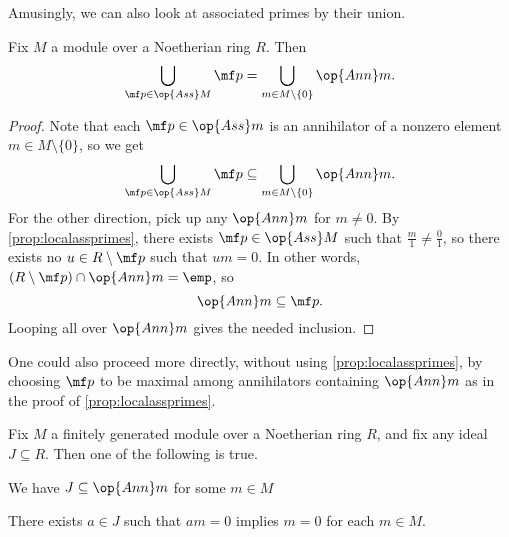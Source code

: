 Amusingly, we can also look at associated primes by their union.
\begin{proposition} \label{prop:unionass}
	Fix $M$ a module over a Noetherian ring $R$. Then
	\[\bigcup_{\mf p\in\op{Ass}M}\mf p=\bigcup_{m\in M\setminus\{0\}}\op{Ann}m.\]
\end{proposition}
\begin{proof}
	Note that each $\mf p\in\op{Ass}m$ is an annihilator of a nonzero element $m\in M\setminus\{0\}$, so we get
	\[\bigcup_{\mf p\in\op{Ass}M}\mf p\subseteq\bigcup_{m\in M\setminus\{0\}}\op{Ann}m.\]
	For the other direction, pick up any $\op{Ann}m$ for $m\ne0$. By \autoref{prop:localassprimes}, there exists $\mf p\in\op{Ass}M$ such that $\frac m1\ne\frac01$, so there exists no $u\in R\setminus\mf p$ such that $um=0$. In other words, $(R\setminus\mf p)\cap\op{Ann}m=\emp$, so
	\[\op{Ann}m\subseteq\mf p.\]
	Looping all over $\op{Ann}m$ gives the needed inclusion.
\end{proof}
\begin{remark}[Serganova]
	One could also proceed more directly, without using \autoref{prop:localassprimes}, by choosing $\mf p$ to be maximal among annihilators containing $\op{Ann}m$ as in the proof of \autoref{prop:localassprimes}.
\end{remark}
\begin{corollary}
	Fix $M$ a finitely generated module over a Noetherian ring $R$, and fix any ideal $J\subseteq R$. Then one of the following is true.
	\begin{listroman}
		\item We have $J\subseteq\op{Ann}m$ for some $m\in M$
		\item There exists $a\in J$ such that $am=0$ implies $m=0$ for each $m\in M$.
	\end{listroman}
\end{corollary}
